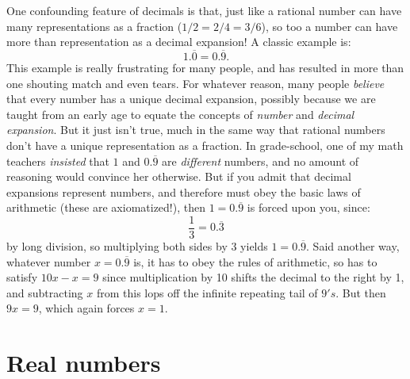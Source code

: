 \documentclass[11pt]{amsart}
\theoremstyle{plain}
\theoremstyle{definition}
\theoremstyle{remark}
\numberwithin{theorem}{section}
\numberwithin{equation}{section}
\begin{document}
One confounding feature of decimals is that, just like a rational number can have many representations as a fraction ($1/2 = 2/4 = 3/6$),
so too a number can have more than representation as a decimal expansion!  A classic example is:
$$
  1.\overline{0} = 0.\overline{9}.
$$ 
This example is really frustrating for many people, and has resulted in more than one shouting match and even tears. 
For whatever reason, many people {\em believe} that every number has a unique decimal expansion, possibly because
we are taught from an early age to equate the concepts of {\em number} and {\em decimal expansion}.  But it just isn't true,
much in the same way that rational numbers don't have a unique representation as a fraction.  In grade-school, one of my math teachers
{\em insisted} that $1$ and $0.\overline{9}$ are {\em different} numbers, and no amount of reasoning would convince her otherwise.  But if you
admit that decimal expansions represent numbers, and therefore must obey the basic laws of arithmetic (these are axiomatized!), then
$1=0.\overline{9}$ is forced upon you, since:
$$
\frac{1}{3} = 0.\overline{3}
$$
by long division, so multiplying both sides by 3 yields $1=0.\overline{9}$.  Said another way, whatever number $x=0.\overline{9}$
is, it has to obey the rules of arithmetic, so has to satisfy $10x - x = 9$ since multiplication by 10 shifts the decimal to the right by 1, 
and subtracting $x$ from this lops off the infinite repeating tail of $9's$.  But then $9x=9$, which again forces $x=1$.

\section{Real numbers}
\end{document}
